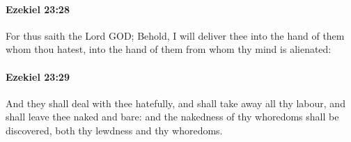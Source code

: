 		\paragraph{Ezekiel 23:28} %
			\label{EZEKIEL-23-28}

			For thus saith the Lord GOD; Behold, I will deliver thee into the hand of them whom thou hatest, into the hand of them from whom thy mind is alienated:


		\paragraph{Ezekiel 23:29} %
			\label{EZEKIEL-23-29}

			And they shall deal with thee hatefully, and shall take away all thy labour, and shall leave thee naked and bare: and the nakedness of thy whoredoms shall be discovered, both thy lewdness and thy whoredoms.


